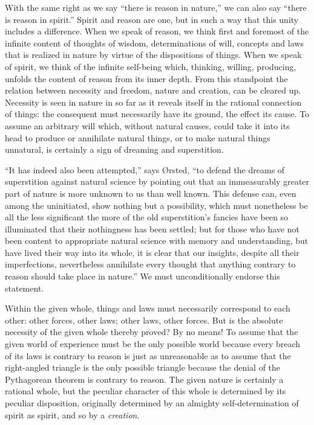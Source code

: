 \documentclass[12pt,a4paper,openany]{book}
\newcommand{\opage}[1]{\marginnote{\footnotesize\textit{[#1]}}}
\begin{document}
With the same right as we say ``there is reason in nature,'' we can also
say ``there is reason in spirit.'' Spirit and reason are one, but in such
a way that this unity includes a difference. When we speak of reason, we
think first and foremost of the infinite content of thoughts of wisdom,
determinations of will, concepts and laws that is realized in nature by
virtue of the dispositions of things. When we speak of spirit, we think
of the infinite self-being which, thinking, willing, producing, unfolds
the content of reason from its inner depth. From this standpoint the
relation between necessity and freedom, nature and creation, can be
cleared up. Necessity is seen in nature in so far as it reveals itself in
the rational connection of things: the consequent must necessarily have
its ground, the effect its cause. To assume an arbitrary will which,
without natural causes, could take it into its head to produce or
annihilate natural things, or to make natural things unnatural, is
certainly a sign of dreaming and superstition.

``It has indeed also been attempted,'' says Ørsted, ``to defend the
dreams of superstition against natural science by pointing out that an
immeasurably greater part of nature is more unknown to us than well
known. This defense can, \opage{15}even among the uninitiated, show nothing but a
possibility, which must nonetheless be all the less significant the more
of the old superstition's fancies have been so illuminated that their
nothingness has been settled; but for those who have not been content to
appropriate natural science with memory and understanding, but have lived
their way into its whole, it is clear that our insights, despite all
their imperfections, nevertheless annihilate every thought that anything
contrary to reason should take place in nature.'' We must unconditionally
endorse this statement.

Within the given whole, things and laws must necessarily correspond to
each other: other forces, other laws; other laws, other forces. But is
the absolute necessity of the given whole thereby proved? By no means! To
assume that the given world of experience must be the only possible world
because every breach of its laws is contrary to reason is just as
unreasonable as to assume that the right-angled triangle is the only
possible triangle because the denial of the Pythagorean theorem is
contrary to reason. The given nature is certainly a rational whole, but
the peculiar character of this whole is determined by its peculiar
disposition, originally determined by an almighty self-determination of
spirit as spirit, and so by a \emph{creation}.
\end{document}
